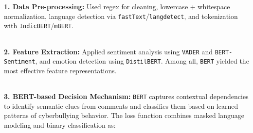 


\textbf{1. Data Pre-processing:} Used regex for cleaning, lowercase + whitespace normalization, language detection via \texttt{fastText}/\texttt{langdetect}, and tokenization with \texttt{IndicBERT}/\texttt{mBERT}.

\text{ } \\
\textbf{2. Feature Extraction:} Applied sentiment analysis using \texttt{VADER} and \texttt{BERT-Sentiment}, and emotion detection using \texttt{DistilBERT}. Among all, \texttt{BERT} yielded the most effective feature representations.

\text{ } \\
\textbf{3. BERT-based Decision Mechanism:} \texttt{BERT} captures contextual dependencies to identify semantic clues from comments and classifies them based on learned patterns of cyberbullying behavior. The loss function combines masked language modeling and binary classification as:

